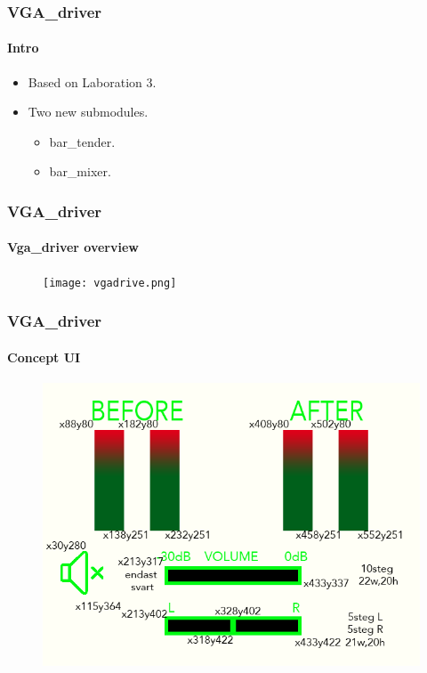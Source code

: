 
\begin{frame}
  \frametitle{VGA\_driver}
  \framesubtitle{Intro}
  \begin{itemize}
  \item<1-> Based on Laboration 3.
  \item<2-> Two new submodules.
    \begin{itemize}
    \item<2-> bar\_tender.
    \item<2-> bar\_mixer.
    \end{itemize}
  \end{itemize}
\end{frame}




\begin{frame}
  \frametitle{VGA\_driver}
  \framesubtitle{Vga\_driver overview}
  \begin{figure}[h]
    \centering 
    \texttt{[image: vgadrive.png]} 
    \label{fig:vgadrive.png}
  \end{figure}
\end{frame}

\begin{frame}
  \frametitle{VGA\_driver}
  \framesubtitle{Concept UI}
  \begin{figure}[h]
    \centering 
    \includegraphics[scale=0.80]{picture_xy.png} 
    \label{fig:picture_xy.png}
  \end{figure}
\end{frame}

